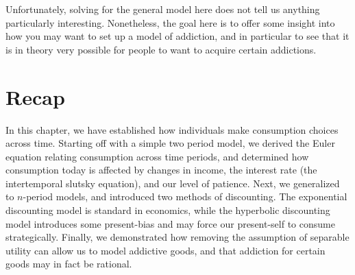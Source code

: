 Unfortunately, solving for the general model here does not tell us anything particularly interesting. Nonetheless, the goal here is to offer some insight into how you may want to set up a model of addiction, and in particular to see that it is in theory very possible for people to want to acquire certain addictions.

\section*{Recap}
In this chapter, we have established how individuals make consumption choices across time. Starting off with a simple two period model, we derived the Euler equation relating consumption across time periods, and determined how consumption today is affected by changes in income, the interest rate (the intertemporal slutsky equation), and our level of patience. Next, we generalized to $n$-period models, and introduced two methods of discounting. The exponential discounting model is standard in economics, while the hyperbolic discounting model introduces some present-bias and may force our present-self to consume strategically. Finally, we demonstrated how removing the assumption of separable utility can allow us to model addictive goods, and that addiction for certain goods may in fact be rational. 